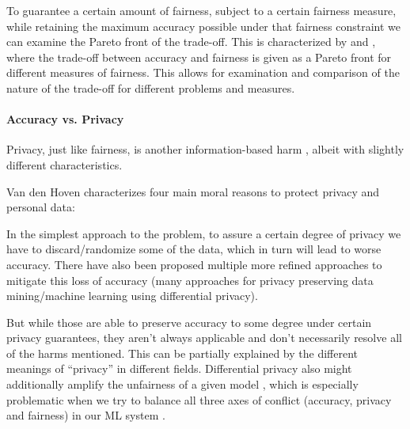 	To guarantee a certain amount of fairness, subject to a certain fairness measure, while retaining the maximum accuracy possible under that fairness constraint we can examine the Pareto front of the trade-off. 	
	This is characterized by \cite{liu2020accuracy} and \cite{wei2020fairness}, where the trade-off between accuracy and fairness is given as a Pareto front for different measures of fairness.
	This allows for examination and comparison of the nature of the trade-off for different problems and measures.
	

	\paragraph{Accuracy vs. Privacy}
	Privacy, just like fairness, is another information-based harm \cite{van2008information}, albeit with slightly different characteristics.

	Van den Hoven \cite{van2008information} characterizes four main moral reasons to protect privacy and personal data:


	In the simplest approach to the problem, to assure a certain degree of privacy we have to discard/randomize some of the data, which in turn will lead to worse accuracy.
	There have also been proposed multiple more refined approaches to mitigate this loss of accuracy (many approaches for privacy preserving data mining/machine learning \eg \cite{duchi2014privacy} using differential privacy).

	But while those are able to preserve accuracy to some degree under certain privacy guarantees, they aren't always applicable and don't necessarily resolve all of the harms mentioned.
	This can be partially explained by the different meanings of \enquote{privacy} in different fields.
	Differential privacy also might additionally amplify the unfairness of a given model \cite{bagdasaryan2019differential}, which is especially problematic when we try to balance all three axes of conflict (accuracy, privacy and fairness) in our ML system \cite{Chester2020}.